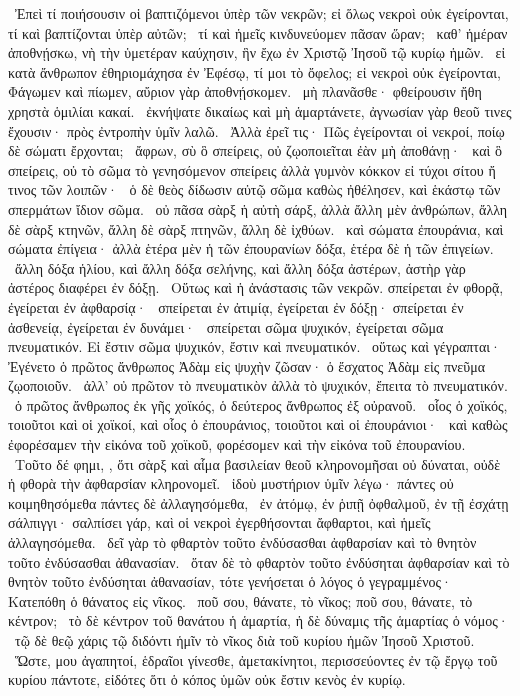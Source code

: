 ~Ἐπεὶ τί ποιήσουσιν οἱ βαπτιζόμενοι ὑπὲρ τῶν νεκρῶν; εἰ ὅλως νεκροὶ οὐκ ἐγείρονται, τί καὶ βαπτίζονται ὑπὲρ αὐτῶν;
~τί καὶ ἡμεῖς κινδυνεύομεν πᾶσαν ὥραν;
~καθ’ ἡμέραν ἀποθνῄσκω, νὴ τὴν ὑμετέραν καύχησιν, ἣν ἔχω ἐν Χριστῷ Ἰησοῦ τῷ κυρίῳ ἡμῶν.
~εἰ κατὰ ἄνθρωπον ἐθηριομάχησα ἐν Ἐφέσῳ, τί μοι τὸ ὄφελος; εἰ νεκροὶ οὐκ ἐγείρονται, Φάγωμεν καὶ πίωμεν, αὔριον γὰρ ἀποθνῄσκομεν.
~μὴ πλανᾶσθε· φθείρουσιν ἤθη χρηστὰ ὁμιλίαι κακαί.
~ἐκνήψατε δικαίως καὶ μὴ ἁμαρτάνετε, ἀγνωσίαν γὰρ θεοῦ τινες ἔχουσιν· πρὸς ἐντροπὴν ὑμῖν λαλῶ.
~Ἀλλὰ ἐρεῖ τις· Πῶς ἐγείρονται οἱ νεκροί, ποίῳ δὲ σώματι ἔρχονται;
~ἄφρων, σὺ ὃ σπείρεις, οὐ ζῳοποιεῖται ἐὰν μὴ ἀποθάνῃ·
~καὶ ὃ σπείρεις, οὐ τὸ σῶμα τὸ γενησόμενον σπείρεις ἀλλὰ γυμνὸν κόκκον εἰ τύχοι σίτου ἤ τινος τῶν λοιπῶν·
~ὁ δὲ θεὸς δίδωσιν αὐτῷ σῶμα καθὼς ἠθέλησεν, καὶ ἑκάστῳ τῶν σπερμάτων ἴδιον σῶμα.
~οὐ πᾶσα σὰρξ ἡ αὐτὴ σάρξ, ἀλλὰ ἄλλη μὲν ἀνθρώπων, ἄλλη δὲ σὰρξ κτηνῶν, ἄλλη δὲ σὰρξ πτηνῶν, ἄλλη δὲ ἰχθύων.
~καὶ σώματα ἐπουράνια, καὶ σώματα ἐπίγεια· ἀλλὰ ἑτέρα μὲν ἡ τῶν ἐπουρανίων δόξα, ἑτέρα δὲ ἡ τῶν ἐπιγείων.
~ἄλλη δόξα ἡλίου, καὶ ἄλλη δόξα σελήνης, καὶ ἄλλη δόξα ἀστέρων, ἀστὴρ γὰρ ἀστέρος διαφέρει ἐν δόξῃ.
~Οὕτως καὶ ἡ ἀνάστασις τῶν νεκρῶν. σπείρεται ἐν φθορᾷ, ἐγείρεται ἐν ἀφθαρσίᾳ·
~σπείρεται ἐν ἀτιμίᾳ, ἐγείρεται ἐν δόξῃ· σπείρεται ἐν ἀσθενείᾳ, ἐγείρεται ἐν δυνάμει·
~σπείρεται σῶμα ψυχικόν, ἐγείρεται σῶμα πνευματικόν. Εἰ ἔστιν σῶμα ψυχικόν, ἔστιν καὶ πνευματικόν.
~οὕτως καὶ γέγραπται· Ἐγένετο ὁ πρῶτος ἄνθρωπος Ἀδὰμ εἰς ψυχὴν ζῶσαν· ὁ ἔσχατος Ἀδὰμ εἰς πνεῦμα ζῳοποιοῦν.
~ἀλλ’ οὐ πρῶτον τὸ πνευματικὸν ἀλλὰ τὸ ψυχικόν, ἔπειτα τὸ πνευματικόν.
~ὁ πρῶτος ἄνθρωπος ἐκ γῆς χοϊκός, ὁ δεύτερος ἄνθρωπος ἐξ οὐρανοῦ.
~οἷος ὁ χοϊκός, τοιοῦτοι καὶ οἱ χοϊκοί, καὶ οἷος ὁ ἐπουράνιος, τοιοῦτοι καὶ οἱ ἐπουράνιοι·
~καὶ καθὼς ἐφορέσαμεν τὴν εἰκόνα τοῦ χοϊκοῦ, φορέσομεν καὶ τὴν εἰκόνα τοῦ ἐπουρανίου.
~Τοῦτο δέ φημι, , ὅτι σὰρξ καὶ αἷμα βασιλείαν θεοῦ κληρονομῆσαι οὐ δύναται, οὐδὲ ἡ φθορὰ τὴν ἀφθαρσίαν κληρονομεῖ.
~ἰδοὺ μυστήριον ὑμῖν λέγω· πάντες οὐ κοιμηθησόμεθα πάντες δὲ ἀλλαγησόμεθα,
~ἐν ἀτόμῳ, ἐν ῥιπῇ ὀφθαλμοῦ, ἐν τῇ ἐσχάτῃ σάλπιγγι· σαλπίσει γάρ, καὶ οἱ νεκροὶ ἐγερθήσονται ἄφθαρτοι, καὶ ἡμεῖς ἀλλαγησόμεθα.
~δεῖ γὰρ τὸ φθαρτὸν τοῦτο ἐνδύσασθαι ἀφθαρσίαν καὶ τὸ θνητὸν τοῦτο ἐνδύσασθαι ἀθανασίαν.
~ὅταν δὲ τὸ φθαρτὸν τοῦτο ἐνδύσηται ἀφθαρσίαν καὶ τὸ θνητὸν τοῦτο ἐνδύσηται ἀθανασίαν, τότε γενήσεται ὁ λόγος ὁ γεγραμμένος· Κατεπόθη ὁ θάνατος εἰς νῖκος.
~ποῦ σου, θάνατε, τὸ νῖκος; ποῦ σου, θάνατε, τὸ κέντρον;
~τὸ δὲ κέντρον τοῦ θανάτου ἡ ἁμαρτία, ἡ δὲ δύναμις τῆς ἁμαρτίας ὁ νόμος·
~τῷ δὲ θεῷ χάρις τῷ διδόντι ἡμῖν τὸ νῖκος διὰ τοῦ κυρίου ἡμῶν Ἰησοῦ Χριστοῦ.
~Ὥστε,  μου ἀγαπητοί, ἑδραῖοι γίνεσθε, ἀμετακίνητοι, περισσεύοντες ἐν τῷ ἔργῳ τοῦ κυρίου πάντοτε, εἰδότες ὅτι ὁ κόπος ὑμῶν οὐκ ἔστιν κενὸς ἐν κυρίῳ.

